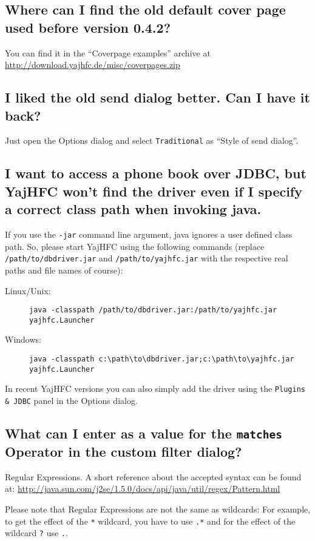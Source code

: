 \documentclass[a4paper,10pt]{scrartcl}
\begin{document}
\subsection{Where can I find the old default cover page used before version 0.4.2?}

You can find it in the ``Coverpage examples'' archive at \url{http://download.yajhfc.de/misc/coverpages.zip}

\subsection{I liked the old send dialog better. Can I have it back?}

Just open the Options dialog and select \texttt{Traditional} as ``Style of send dialog''.

\subsection{I want to access a phone book over JDBC, but YajHFC won't find the driver even if I specify a correct class path when invoking java.}

If you use the \texttt{-jar} command line argument, java ignores a user defined class path.
So, please start YajHFC using the following commands (replace \texttt{/path/to/dbdriver.jar} and \texttt{/path/to/yajhfc.jar} with the respective real paths and file names of course):
\begin{description}
\item [Linux/Unix:] \verb#java -classpath /path/to/dbdriver.jar:/path/to/yajhfc.jar yajhfc.Launcher#
\item [Windows:] \verb#java -classpath c:\path\to\dbdriver.jar;c:\path\to\yajhfc.jar yajhfc.Launcher#
\end{description}

In recent YajHFC versions you can also simply add the driver using the \texttt{Plugins \& JDBC} panel in the Options dialog.

\subsection{What can I enter as a value for the \texttt{matches} Operator in the custom filter dialog?}

Regular Expressions. A short reference about the accepted syntax can be found at:
\url{http://java.sun.com/j2se/1.5.0/docs/api/java/util/regex/Pattern.html}

Please note that Regular Expressions are not the same as wildcards: 
For example, to get the effect of the \verb.*. wildcard, you have to use \verb#.*# and 
for the effect of the wildcard \verb#?# use \verb#.#.
\end{document}
